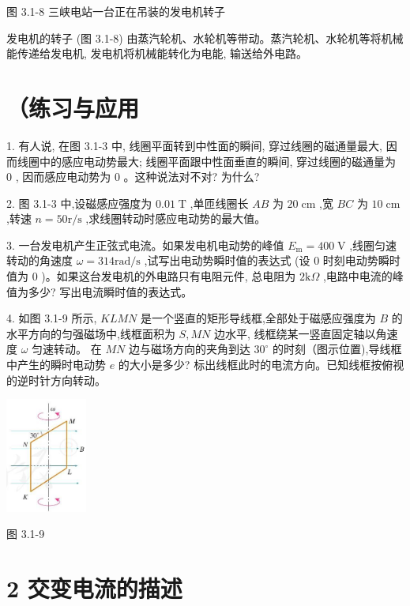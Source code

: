 \documentclass[10pt]{article}
\begin{document}
图 3.1-8 三峡电站一台正在吊装的发电机转子

发电机的转子 (图 3.1-8) 由蒸汽轮机、水轮机等带动。蒸汽轮机、水轮机等将机械能传递给发电机, 发电机将机械能转化为电能, 输送给外电路。

\section*{（练习与应用}

1. 有人说, 在图 3.1-3 中, 线圈平面转到中性面的瞬间, 穿过线圈的磁通量最大, 因而线圈中的感应电动势最大; 线圈平面跟中性面垂直的瞬间, 穿过线圈的磁通量为 0 , 因而感应电动势为 0 。这种说法对不对? 为什么?

2. 图 3.1-3 中,设磁感应强度为 \({0.01}\mathrm{\;T}\) ,单匝线圈长 \({AB}\) 为 \({20}\mathrm{\;{cm}}\) ,宽 \({BC}\) 为 \({10}\mathrm{\;{cm}}\) ,转速 \(n = {50}\mathrm{r}/\mathrm{s}\) ,求线圈转动时感应电动势的最大值。

3. 一台发电机产生正弦式电流。如果发电机电动势的峰值 \({E}_{\mathrm{m}} = {400}\mathrm{\;V}\) ,线圈匀速转动的角速度 \(\omega = {314}\mathrm{{rad}}/\mathrm{s}\) ,试写出电动势瞬时值的表达式 (设 0 时刻电动势瞬时值为 0 )。如果这台发电机的外电路只有电阻元件, 总电阻为 \(2\mathrm{k}\Omega\) ,电路中电流的峰值为多少? 写出电流瞬时值的表达式。

4. 如图 3.1-9 所示, \({KLMN}\) 是一个竖直的矩形导线框,全部处于磁感应强度为 \(B\) 的水平方向的匀强磁场中,线框面积为 \(S,{MN}\) 边水平, 线框绕某一竖直固定轴以角速度 \(\omega\) 匀速转动。 在 \({MN}\) 边与磁场方向的夹角到达 \({30}^{ \circ }\) 的时刻（图示位置),导线框中产生的瞬时电动势 \(e\) 的大小是多少? 标出线框此时的电流方向。已知线框按俯视的逆时针方向转动。

\begin{center}
\includegraphics[max width=0.2\textwidth]{images/01910e72-c5b7-7ed5-a6d4-fb3a5faefc32_58_859516.jpg}
\end{center}

图 3.1-9

\section*{2 交变电流的描述}
\end{document}
